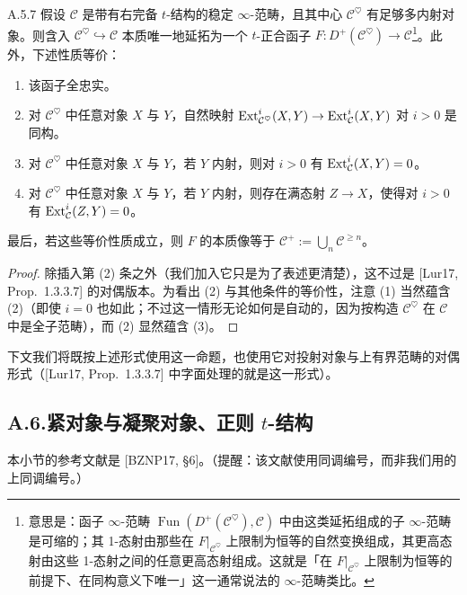 \begin{prop}{A.5.7}\label{prop:a4-17-A-5-7}
假设 $\mathcal C$ 是带有右完备 $t$-结构的稳定 $\infty$-范畴，且其中心 $\mathcal C^{\heartsuit}$ 有足够多内射对象。则含入 $\mathcal C^{\heartsuit}\hookrightarrow\mathcal C$ 本质唯一地延拓为一个 $t$-正合函子 $F:D^+(\mathcal C^{\heartsuit})\to\mathcal C$\footnote{意思是：函子 $\infty$-范畴 $\operatorname{Fun}(D^+(\mathcal C^{\heartsuit}),\mathcal C)$ 中由这类延拓组成的子 $\infty$-范畴是可缩的；其 1-态射由那些在 $F|_{\mathcal C^{\heartsuit}}$ 上限制为恒等的自然变换组成，其更高态射由这些 1-态射之间的任意更高态射组成。这就是「在 $F|_{\mathcal C^{\heartsuit}}$ 上限制为恒等的前提下、在同构意义下唯一」这一通常说法的 $\infty$-范畴类比。}。此外，下述性质等价：
\begin{enumerate}[label=(\arabic*)]
\item 该函子全忠实。
\item 对 $\mathcal C^{\heartsuit}$ 中任意对象 $X$ 与 $Y$，自然映射 $\operatorname{Ext}^i_{\mathcal C^{\heartsuit}}(X,Y)\to\operatorname{Ext}^i_{\mathcal C}(X,Y)$ 对 $i>0$ 是同构。
\item 对 $\mathcal C^{\heartsuit}$ 中任意对象 $X$ 与 $Y$，若 $Y$ 内射，则对 $i>0$ 有 $\operatorname{Ext}^i_{\mathcal C}(X,Y)=0$。
\item 对 $\mathcal C^{\heartsuit}$ 中任意对象 $X$ 与 $Y$，若 $Y$ 内射，则存在满态射 $Z\to X$，使得对 $i>0$ 有 $\operatorname{Ext}^i_{\mathcal C}(Z,Y)=0$。
\end{enumerate}
最后，若这些等价性质成立，则 $F$ 的本质像等于 $\mathcal C^+:=\bigcup_n\mathcal C^{\geq n}$。
\end{prop}

\begin{proof}
除插入第 \textup{(2)} 条之外（我们加入它只是为了表述更清楚），这不过是 [Lur17, Prop.~1.3.3.7] 的对偶版本。为看出 \textup{(2)} 与其他条件的等价性，注意 \textup{(1)} 当然蕴含 \textup{(2)}（即使 $i=0$ 也如此；不过这一情形无论如何是自动的，因为按构造 $\mathcal C^{\heartsuit}$ 在 $\mathcal C$ 中是全子范畴），而 \textup{(2)} 显然蕴含 \textup{(3)}。
\end{proof}

下文我们将既按上述形式使用这一命题，也使用它对投射对象与上有界范畴的对偶形式（[Lur17, Prop.~1.3.3.7] 中字面处理的就是这一形式）。

\subsection*{A.6.\quad 紧对象与凝聚对象、正则 $t$-结构}

本小节的参考文献是 [BZNP17, §6]。（提醒：该文献使用同调编号，而非我们用的上同调编号。）

